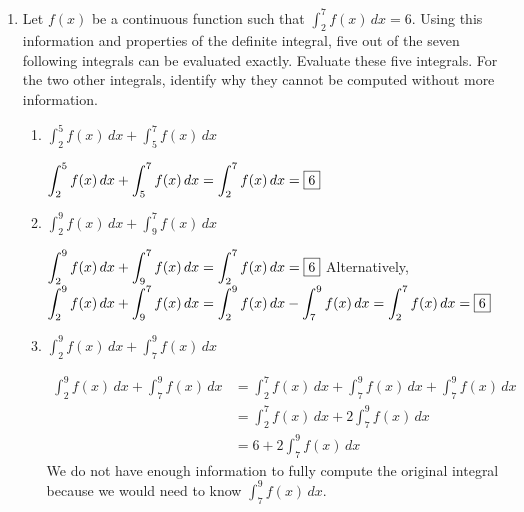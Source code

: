 \documentclass{article}
\begin{document}
\begin{enumerate}
\begin{enumerate}
  \item
    \begin{problem}
      If there were enough food left to feed all people in line at 5 pm,
      at approximately what time would the work of the soup kitchen be
      done? Provide both an  exact answer involving a definite integral and an approximation.
    \end{problem}
\vfill
    \begin{solution}
      $\displaystyle \frac{\int_6^{17} r(t)\,dt - 1600}{200}$ hours after
      5 pm, which is $\approx$ 6:45 pm. 
    \end{solution}
  \end{enumerate}


  \newpage

  
\item Let $f(x)$ be a continuous function such that $\displaystyle \int_2^7 f(x)\,dx=6$. Using this information and properties of the definite integral, five out of the seven following integrals can be evaluated exactly. Evaluate these five integrals. For the two other integrals, identify why they cannot be computed without more information.
    \begin{enumerate}

    \item $\displaystyle \int_2^5 f(x)\,dx + \displaystyle \int_5^7 f(x)\,dx $
    
    \begin{solution}
     $\displaystyle \int_2^5 f(x)\,dx+\displaystyle \int_5^7 f(x)\,dx=\displaystyle \int_2^7 f(x)\,dx=\fbox{6}$   
    \end{solution}
    \vfill
    
\item $\displaystyle \int_2^9 f(x)\,dx + \displaystyle \int_9^7 f(x)\,dx $

\begin{solution}
$\displaystyle \int_2^9 f(x)\,dx + \displaystyle \int_9^7 f(x)\,dx =\displaystyle \int_2^7 f(x)\,dx=\fbox{6}$ \newline 
Alternatively, 
$\displaystyle \int_2^9 f(x)\,dx + \displaystyle \int_9^7 f(x)\,dx = \displaystyle \int_2^9 f(x)\,dx - \displaystyle \int_7^9 f(x)\,dx =\displaystyle \int_2^7 f(x)\,dx=\fbox{6}$
\end{solution}
\vfill 
\item $\displaystyle \int_2^9 f(x)\,dx + \displaystyle \int_7^9 f(x)\,dx $

\begin{solution}
\begin{align*}
\displaystyle \int_2^9 f(x)\,dx + \displaystyle \int_7^9 f(x)\,dx &= \displaystyle \int_2^7 f(x)\,dx + \displaystyle \int_7^9 f(x)\,dx + \displaystyle \int_7^9 f(x)\,dx \\&= \displaystyle \int_2^7 f(x)\,dx + 2\displaystyle \int_7^9 f(x)\,dx\\&=6+2\displaystyle \int_7^9 f(x)\,dx
\end{align*}
We do not have enough information to fully compute the original integral because we would need to know $\displaystyle \int_7^9 f(x)\,dx$.
\end{solution}



\end{enumerate}
\end{enumerate}
\end{document}
